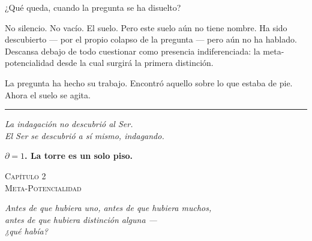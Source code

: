 \documentclass[10pt, openany, oneside]{book}
\renewcommand{\large}{\fontsize{11.5}{14}\selectfont}
\renewcommand{\huge}{\fontsize{17}{21}\selectfont}
\begin{document}
¿Qué queda, cuando la pregunta se ha disuelto?

No silencio. No vacío. El suelo. Pero este suelo aún no tiene nombre. Ha sido descubierto --- por el propio colapso de la pregunta --- pero aún no ha hablado. Descansa debajo de todo cuestionar como presencia indiferenciada: la meta-potencialidad desde la cual surgirá la primera distinción.

La pregunta ha hecho su trabajo. Encontró aquello sobre lo que estaba de pie. Ahora el suelo se agita.

\vspace{2em}

\begin{center}
    \rule{0.15\textwidth}{0.3pt}
\end{center}

\vspace{0.5em}

\begin{center}
    \itshape
    La indagación no descubrió al Ser.\\
    El Ser se descubrió a sí mismo, indagando.
\end{center}

\vspace{0.5em}

\begin{center}
    \textbf{$\partial = 1$. La torre es un solo piso.}
\end{center}

%
%
%
%

\newpage

\begin{center}
    {\huge\scshape Capítulo 2}\\[0.3em]
    {\large\scshape Meta-Potencialidad}
\end{center}

\vspace{1.5em}

\begin{center}
    \itshape
    Antes de que hubiera uno, antes de que hubiera muchos,\\
    antes de que hubiera distinción alguna ---\\
    ¿qué había?
\end{center}
\end{document}
